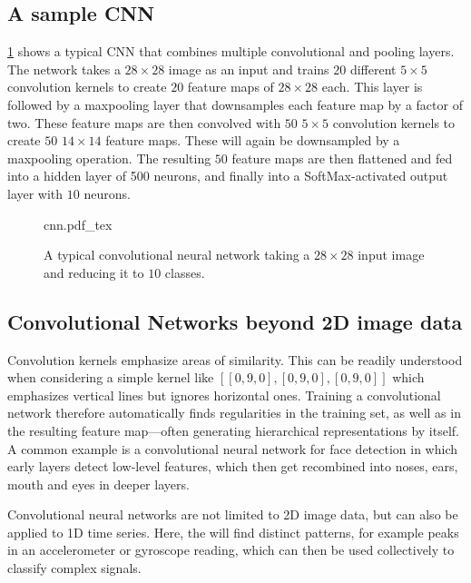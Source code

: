\subsection{A sample CNN}

\cref{fig:cnn} shows a typical CNN that combines multiple convolutional and pooling layers. The network takes a $28\times28$ image as an input and trains $20$ different $5\times5$ convolution kernels to create $20$ feature maps of $28\times28$ each. This layer is followed by a maxpooling layer that downsamples each feature map by a factor of two. These feature maps are then convolved with $50$ $5\times5$ convolution kernels to create $50$ $14\times14$ feature maps. These will again be downsampled by a maxpooling operation. The resulting $50$ feature maps are then flattened and fed into a hidden layer of 500 neurons, and finally into a SoftMax-activated output layer with $10$ neurons.

\begin{figure}[htb]
\tiny
    \centering
    \def\svgwidth{\textwidth}
    {cnn.pdf_tex}
    \caption{A typical convolutional neural network taking a $28\times28$ input image and reducing it to $10$ classes.\label{fig:cnn}}
\end{figure}

\subsection{Convolutional Networks beyond 2D image data}

Convolution kernels emphasize areas of similarity. This can be readily understood when considering a simple kernel like $[[0,9,0],[0,9,0],[0,9,0]]$ which emphasizes vertical lines but ignores horizontal ones. Training a convolutional network therefore automatically finds regularities in the training set, as well as in the resulting feature map---often generating hierarchical representations by itself. A common example is a convolutional neural network for face detection in which early layers detect low-level features, which then get recombined into noses, ears, mouth and eyes in deeper layers.

Convolutional neural networks are not limited to 2D image data, but can also be applied to 1D time series. Here, the will find distinct patterns, for example peaks in an accelerometer or gyroscope reading, which can then be used collectively to classify complex signals.

